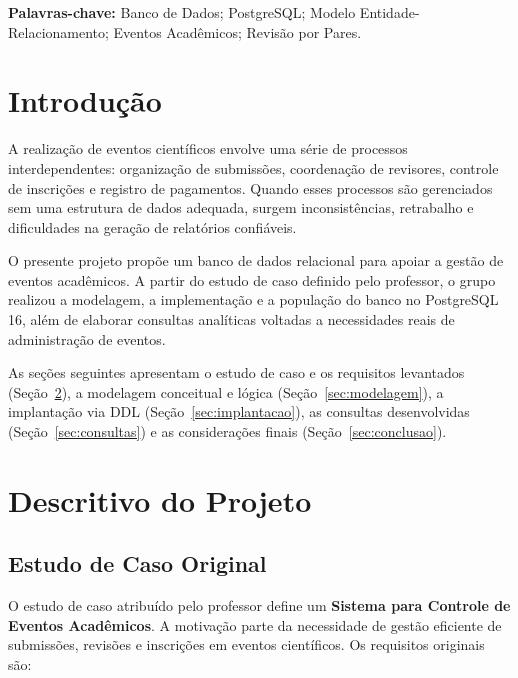 \documentclass[12pt,a4paper]{article}
\begin{document}
\vspace{0.5cm}
\noindent\textbf{Palavras-chave:} Banco de Dados; PostgreSQL; Modelo Entidade-Relacionamento;
Eventos Acadêmicos; Revisão por Pares.

\newpage

\section{Introdução}
\label{sec:introducao}

A realização de eventos científicos envolve uma série de processos interdependentes: organização de submissões, coordenação de revisores, controle de inscrições e registro de pagamentos. Quando esses processos são gerenciados sem uma estrutura de dados adequada, surgem inconsistências, retrabalho e dificuldades na geração de relatórios confiáveis.

O presente projeto propõe um banco de dados relacional para apoiar a gestão de eventos acadêmicos. A partir do estudo de caso definido pelo professor, o grupo realizou a modelagem, a implementação e a população do banco no PostgreSQL 16, além de elaborar consultas analíticas voltadas a necessidades reais de administração de eventos.

As seções seguintes apresentam o estudo de caso e os requisitos levantados (Seção~\ref{sec:descritivo}), a modelagem conceitual e lógica (Seção~\ref{sec:modelagem}), a implantação via DDL (Seção~\ref{sec:implantacao}), as consultas desenvolvidas (Seção~\ref{sec:consultas}) e as considerações finais (Seção~\ref{sec:conclusao}).

\section{Descritivo do Projeto}
\label{sec:descritivo}

\subsection{Estudo de Caso Original}
\label{subsec:caso-original}

O estudo de caso atribuído pelo professor define um \textbf{Sistema para Controle
de Eventos Acadêmicos}. A motivação parte da necessidade de gestão eficiente de
submissões, revisões e inscrições em eventos científicos. Os requisitos originais
são:
\end{document}
